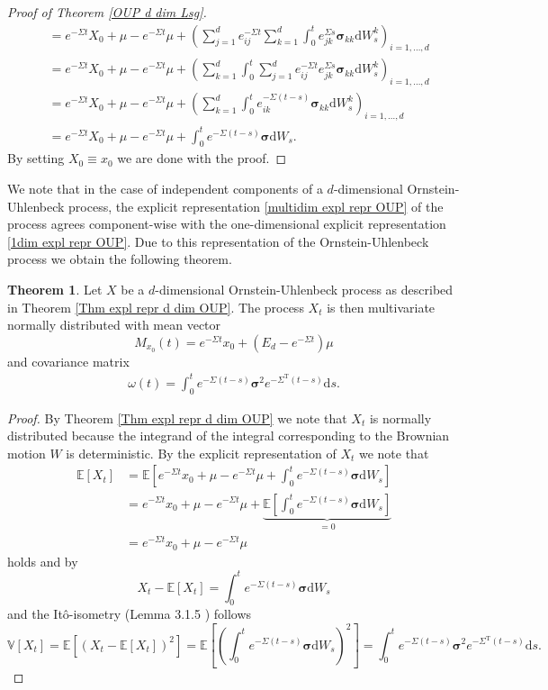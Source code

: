 \documentclass[11pt,titlepage]{article}
\newcommand{\E}{\mathbb{E}} %
\newcommand{\V}{\mathbb{V}} %
\theoremstyle{definition}
\newtheorem{theorem}{Theorem}[section]
\theoremstyle{remark}
\begin{document}
\begin{proof}[Proof of Theorem \ref{OUP d dim Lsg}]
\begin{align*}
			&=e^{-\Sigma t}X_0 +\mu -e^{-\Sigma t}\mu +\left(\sum_{j=1}^d e^{-\Sigma t}_{ij}\sum_{k=1}^d\int_0^t 
			e^{\Sigma s}_{jk}\boldsymbol{\sigma}_{kk}\mathrm{d}W_s^k\right)_{i=1,\ldots,d}\\
			&=e^{-\Sigma t}X_0 +\mu -e^{-\Sigma t}\mu +\left(\sum_{k=1}^d\int_0^t\sum_{j=1}^d e^{-\Sigma t}_{ij} 
			e^{\Sigma s}_{jk}\boldsymbol{\sigma}_{kk}\mathrm{d}W_s^k\right)_{i=1,\ldots,d}\\
			&=e^{-\Sigma t}X_0 +\mu -e^{-\Sigma t}\mu +\left(\sum_{k=1}^d\int_0^t e^{-\Sigma(t-s) }_{ik} \boldsymbol{\sigma}_{kk}\mathrm{d}W_s^k\right)_{i=1,\ldots,d}\\
			&= e^{-\Sigma t}X_0+\mu-e^{-\Sigma t}\mu+\int_0^t e^{-\Sigma(t-s)}\boldsymbol{\sigma}\mathrm{d}W_s.
		\end{align*} 
		By setting $X_0\equiv x_0$ we are done with the proof.
	\end{proof}
	
	We note that in the case of independent components of a $d$-dimensional Ornstein-Uhlenbeck process, the explicit representation \ref{multidim expl repr OUP} of the process agrees component-wise with the one-dimensional explicit representation \ref{1dim expl repr OUP}. 
	Due to this representation of the Ornstein-Uhlenbeck process we obtain the following theorem.
	
	\begin{theorem}
		Let $X$ be a $d$-dimensional Ornstein-Uhlenbeck process as described in Theorem \ref{Thm expl repr d dim OUP}. The process $X_t$ is then multivariate normally distributed with 
		mean vector 
		\[M_{x_0}(t) = e^{-\Sigma t} x_0 + (E_d -e^{-\Sigma t})\mu\]
		and covariance matrix
		\begin{align*}
			\omega(t) = \int_{0}^t e^{-\Sigma (t-s)}\boldsymbol{\sigma}^2 e^{-\Sigma^\text{T}(t-s)}\mathrm{d}s.
		\end{align*}
	\end{theorem}
		
	\begin{proof}
		By Theorem \ref{Thm expl repr d dim OUP} we note that $X_t$ is normally distributed because the integrand of the integral corresponding to the Brownian motion $W$ is deterministic. 
		By the explicit representation of $X_t$ we note that
		\begin{align*}
			\E[X_t] &= \E\left[e^{-\Sigma t}x_0+\mu-e^{-\Sigma t}\mu+\int_0^t e^{-\Sigma(t-s)}\boldsymbol{\sigma}\mathrm{d}W_s\right]\\
			&=e^{-\Sigma t}x_0+\mu-e^{-\Sigma t}\mu +\underbrace{\E\left[\int_0^t e^{-\Sigma(t-s)}\boldsymbol{\sigma}\mathrm{d}W_s\right]}_{=0}\\
			&=e^{-\Sigma t}x_0+\mu-e^{-\Sigma t}\mu
		\end{align*}
		holds and by
		\[X_t-\E[X_t]= \int_0^t e^{-\Sigma(t-s)}\boldsymbol{\sigma}\mathrm{d}W_s\]
		and the Itô-isometry (Lemma 3.1.5 \cite{Oksendal2002}) follows
		\[\V[X_t]=\E[(X_t -\E[X_t])^2] = \E\left[\left(\int_0^t e^{-\Sigma(t-s)}\boldsymbol{\sigma}\mathrm{d}W_s\right)^2\right] = \int_0^t e^{-\Sigma(t-s)}\boldsymbol{\sigma}^2 e^{-\Sigma^\text{T}(t-s)}\mathrm{d}s.\]
	\end{proof}
	
\end{document}
